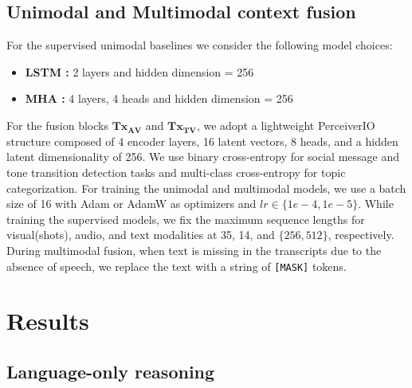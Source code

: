 \subsection{Unimodal and Multimodal context fusion}
For the supervised unimodal baselines we consider the following model choices:
\begin{itemize}
    \item \textbf{LSTM \cite{lstm}:} 2 layers and hidden dimension = 256
    \item \textbf{MHA \cite{transformers}:} 4 layers, 4 heads and hidden dimension = 256
\end{itemize}
For the fusion blocks $\mathbf{{Tx}_{AV}}$ and $\mathbf{{Tx}_{TV}}$, we adopt a lightweight PerceiverIO structure composed of 4 encoder layers, 16 latent vectors, 8 heads, and a hidden latent dimensionality of 256. We use binary cross-entropy for social message and tone transition detection tasks and multi-class cross-entropy for topic categorization. For training the unimodal and multimodal models, we use a batch size of 16 with Adam \cite{Kingma2015AdamAM} or AdamW \cite{AdamW} as optimizers and $lr \in \{1e-4, 1e-5\}$. While training the supervised models, we fix the maximum sequence lengths for visual(shots), audio, and text modalities at 35, 14, and $\{256,512\}$, respectively. During multimodal fusion, when text is missing in the transcripts due to the absence of speech, we replace the text with a string of \texttt{[MASK]} tokens.

\section{Results}

\subsection{Language-only reasoning}

